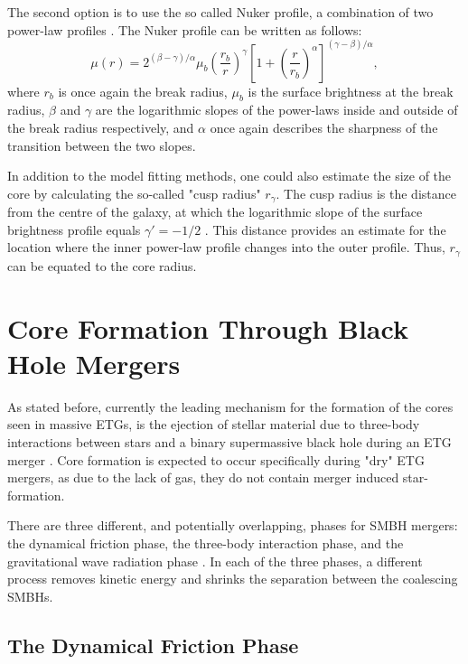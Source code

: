 \documentclass[english, twoside]{HYgradu}
\begin{document}
The second option is to use the so called Nuker profile, a combination of two power-law profiles \citep{Lauer1995}. The Nuker profile can be written as follows:
\begin{equation}
\mu(r) = 2^{(\beta - \gamma) / \alpha} \mu_b \left( \frac{r_b}{r} \right)^\gamma \left[ 1 + \left( \frac{r}{r_b} \right)^\alpha \right]^{(\gamma - \beta)/\alpha},
\label{eq:nuker}
\end{equation}
where $r_b$ is once again the break radius, $\mu_b$ is the surface brightness at the break radius, $\beta$ and $\gamma$ are the logarithmic slopes of the power-laws inside and outside of the break radius respectively, and $\alpha$ once again describes the sharpness of the transition between the two slopes.

In addition to the model fitting methods, one could also estimate the size of the core by calculating the so-called "cusp radius" $r_\gamma$. The cusp radius is the distance from the centre of the galaxy, at which the logarithmic slope of the surface brightness profile equals $\gamma' = -1/2$ \citep{Carollo1997, Lauer2007Cusp}. This distance provides an estimate for the location where the inner power-law profile changes into the outer profile. Thus, $r_\gamma$ can be equated to the core radius. 

\section{Core Formation Through Black Hole Mergers}

As stated before, currently the leading mechanism for the formation of the cores seen in massive ETGs, is the ejection of stellar material due to three-body interactions between stars and a binary supermassive black hole during an ETG merger \citep[e.g.][]{Faber1997, Milosavljevic2002, GalaxyFormationAndEvo2010}. Core formation is expected to occur specifically during "dry" ETG mergers, as due to the lack of gas, they do not contain merger induced star-formation.

There are three different, and potentially overlapping, phases for SMBH mergers: the dynamical friction phase, the three-body interaction phase, and the gravitational wave radiation phase \citep{MerrittBook}. In each of the three phases, a different process removes kinetic energy and shrinks the separation between the coalescing SMBHs.

\subsection{The Dynamical Friction Phase}
\end{document}
